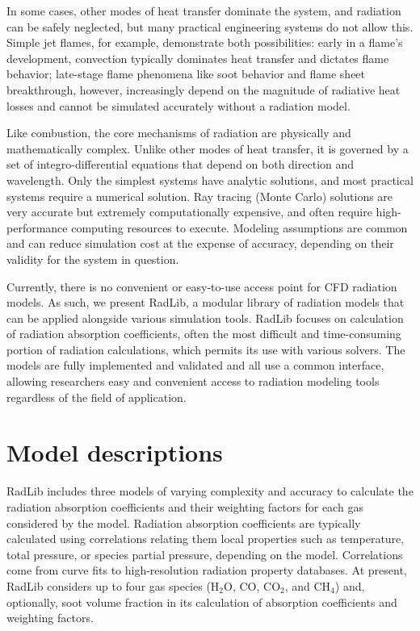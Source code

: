 \documentclass[preprint,12pt, a4paper]{elsarticle}
\begin{document}
In some cases, other modes of heat transfer dominate the system, and radiation can be safely neglected, but many practical engineering systems do not allow this. Simple jet flames, for example, demonstrate both possibilities: early in a flame's development, convection typically dominates heat transfer and dictates flame behavior; late-stage flame phenomena like soot behavior and flame sheet breakthrough, however, increasingly depend on the magnitude of radiative heat losses and cannot be simulated accurately without a radiation model. 

Like combustion, the core mechanisms of radiation are physically and mathematically complex. Unlike other modes of heat transfer, it is governed by a set of integro-differential equations that depend on both direction and wavelength. Only the simplest systems have analytic solutions, and most practical systems require a numerical solution. Ray tracing (Monte Carlo) solutions are very accurate but extremely computationally expensive, and often require high-performance computing resources to execute. Modeling assumptions are common and can reduce simulation cost at the expense of accuracy, depending on their validity for the system in question. 

Currently, there is no convenient or easy-to-use access point for CFD radiation models. As such, we present RadLib, a modular library of radiation models that can be applied alongside various simulation tools. RadLib focuses on calculation of radiation absorption coefficients, often the most difficult and time-consuming portion of radiation calculations, which permits its use with various solvers. The models are fully implemented and validated and all use a common interface, allowing researchers easy and convenient access to radiation modeling tools regardless of the field of application.

\section{Model descriptions}
\label{s:models}

RadLib includes three models of varying complexity and accuracy to calculate the radiation absorption coefficients and their weighting factors for each gas considered by the model. Radiation absorption coefficients are typically calculated using correlations relating them local properties such as temperature, total pressure, or species partial pressure, depending on the model. Correlations come from curve fits to high-resolution radiation property databases. At present, RadLib considers up to four gas species (H$_2$O, CO, CO$_2$, and CH$_4$) and, optionally, soot volume fraction in its calculation of absorption coefficients and weighting factors. 
\end{document}
